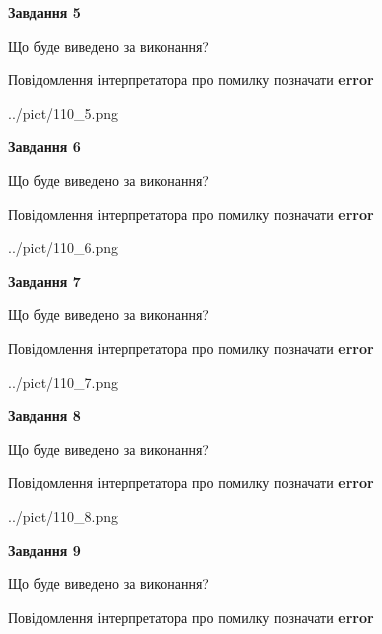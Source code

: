 \documentclass[11pt, ukrainian]{article}
\begin{document}
{\begin {large}
{\begin {center}\textbf{Завдання 5}\end {center}}\par
Що буде виведено за виконання? \par
Повідомлення інтерпретатора про помилку позначати \textbf{error}

\begin{center}
	{../pict/110_5.png}
\end{center}
\newpage

{\begin {center}\textbf{Завдання 6}\end {center}}\par
Що буде виведено за виконання? \par
Повідомлення інтерпретатора про помилку позначати \textbf{error}

\begin{center}
	{../pict/110_6.png}
\end{center}
\newpage

{\begin {center}\textbf{Завдання 7}\end {center}}\par
Що буде виведено за виконання? \par
Повідомлення інтерпретатора про помилку позначати \textbf{error}

\begin{center}
	{../pict/110_7.png}
\end{center}
\newpage

{\begin {center}\textbf{Завдання 8}\end {center}}\par
Що буде виведено за виконання? \par
Повідомлення інтерпретатора про помилку позначати \textbf{error}

\begin{center}
	{../pict/110_8.png}
\end{center}
\newpage

{\begin {center}\textbf{Завдання 9}\end {center}}\par
Що буде виведено за виконання? \par
Повідомлення інтерпретатора про помилку позначати \textbf{error}


\end{large}}
\end{document}
